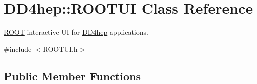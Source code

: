 \hypertarget{class_d_d4hep_1_1_r_o_o_t_u_i}{}\section{D\+D4hep\+:\+:R\+O\+O\+T\+UI Class Reference}
\label{class_d_d4hep_1_1_r_o_o_t_u_i}


\hyperlink{namespace_r_o_o_t}{R\+O\+OT} interactive UI for \hyperlink{namespace_d_d4hep}{D\+D4hep} applications.  




{\ttfamily \#include $<$R\+O\+O\+T\+U\+I.\+h$>$}

\subsection*{Public Member Functions}
